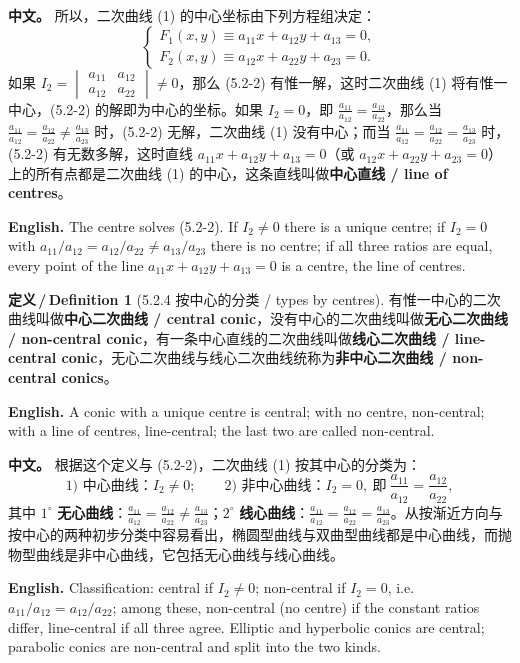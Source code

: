 \documentclass[UTF8,11pt,a4paper]{ctexart}
\newcommand{\APS}[2]{\par\noindent\textbf{中文。} #1\par\noindent\textbf{English.} #2\par\smallskip}
\newcommand{\EN}[1]{\par\noindent \textbf{English.} #1\par}
\theoremstyle{definition}
\newtheorem*{definition}{定义\,/\,Definition}
\begin{document}
\APS{所以，二次曲线 (1) 的中心坐标由下列方程组决定：
\[
\begin{cases}F_1(x,y)\equiv a_{11}x+a_{12}y+a_{13}=0,\\ F_2(x,y)\equiv a_{12}x+a_{22}y+a_{23}=0.\end{cases}\tag{5.2-2}
\]
如果 $I_2=\begin{vmatrix}a_{11}&a_{12}\\ a_{12}&a_{22}\end{vmatrix}\ne0$，那么 (5.2-2) 有惟一解，这时二次曲线 (1) 将有惟一中心，(5.2-2) 的解即为中心的坐标。如果 $I_2=0$，即 $\frac{a_{11}}{a_{12}}=\frac{a_{12}}{a_{22}}$，那么当 $\frac{a_{11}}{a_{12}}=\frac{a_{12}}{a_{22}}\ne\frac{a_{13}}{a_{23}}$ 时，(5.2-2) 无解，二次曲线 (1) 没有中心；而当 $\frac{a_{11}}{a_{12}}=\frac{a_{12}}{a_{22}}=\frac{a_{13}}{a_{23}}$ 时，(5.2-2) 有无数多解，这时直线 $a_{11}x+a_{12}y+a_{13}=0$（或 $a_{12}x+a_{22}y+a_{23}=0$）上的所有点都是二次曲线 (1) 的中心，这条直线叫做\textbf{中心直线 / line of centres}。}{The centre solves (5.2-2). If $I_2\ne0$ there is a unique centre; if $I_2=0$ with $a_{11}/a_{12}=a_{12}/a_{22}\ne a_{13}/a_{23}$ there is no centre; if all three ratios are equal, every point of the line $a_{11}x+a_{12}y+a_{13}=0$ is a centre, the line of centres.}

\begin{definition}[5.2.4 按中心的分类 / types by centres]\label{def:centretype}
有惟一中心的二次曲线叫做\textbf{中心二次曲线 / central conic}，没有中心的二次曲线叫做\textbf{无心二次曲线 / non-central conic}，有一条中心直线的二次曲线叫做\textbf{线心二次曲线 / line-central conic}，无心二次曲线与线心二次曲线统称为\textbf{非中心二次曲线 / non-central conics}。
\EN{A conic with a unique centre is central; with no centre, non-central; with a line of centres, line-central; the last two are called non-central.}
\end{definition}

\APS{根据这个定义与 (5.2-2)，二次曲线 (1) 按其中心的分类为：
\[
\text{1) 中心曲线：}I_2\ne0;\qquad
\text{2) 非中心曲线：}I_2=0,\ \text{即}\ \frac{a_{11}}{a_{12}}=\frac{a_{12}}{a_{22}},
\]
其中 $1^\circ$ \textbf{无心曲线}：$\frac{a_{11}}{a_{12}}=\frac{a_{12}}{a_{22}}\ne\frac{a_{13}}{a_{23}}$；$2^\circ$ \textbf{线心曲线}：$\frac{a_{11}}{a_{12}}=\frac{a_{12}}{a_{22}}=\frac{a_{13}}{a_{23}}$。从按渐近方向与按中心的两种初步分类中容易看出，椭圆型曲线与双曲型曲线都是中心曲线，而抛物型曲线是非中心曲线，它包括无心曲线与线心曲线。}{Classification: central if $I_2\ne0$; non-central if $I_2=0$, i.e.\ $a_{11}/a_{12}=a_{12}/a_{22}$; among these, non-central (no centre) if the constant ratios differ, line-central if all three agree. Elliptic and hyperbolic conics are central; parabolic conics are non-central and split into the two kinds.}
\end{document}

